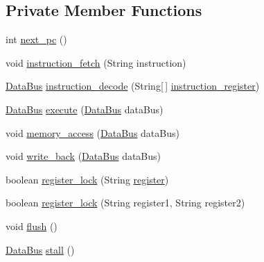 \subsection*{Private Member Functions}
\begin{DoxyCompactItemize}
\item 
int \mbox{\hyperlink{class_c_p_u_a9926463b06331bffb789febcf3cd102f}{next\+\_\+pc}} ()
\item 
void \mbox{\hyperlink{class_c_p_u_a23d225d9e85ee08b1084782d2702f62e}{instruction\+\_\+fetch}} (String instruction)
\item 
\mbox{\hyperlink{class_data_bus}{Data\+Bus}} \mbox{\hyperlink{class_c_p_u_aa2f0a271b5c6137569fe9c206388bdcc}{instruction\+\_\+decode}} (String\mbox{[}$\,$\mbox{]} \mbox{\hyperlink{class_c_p_u_ab98b435ffcf92f6c7c33992af4ebe43a}{instruction\+\_\+register}})
\item 
\mbox{\hyperlink{class_data_bus}{Data\+Bus}} \mbox{\hyperlink{class_c_p_u_a53da2e36c38199794f20432b9eb558e1}{execute}} (\mbox{\hyperlink{class_data_bus}{Data\+Bus}} data\+Bus)
\item 
void \mbox{\hyperlink{class_c_p_u_ab50af6d8dde2323a1ceea8c58e3ce5a8}{memory\+\_\+access}} (\mbox{\hyperlink{class_data_bus}{Data\+Bus}} data\+Bus)
\item 
void \mbox{\hyperlink{class_c_p_u_a130b9ffccc2c76d5bcc1b30ef5c4a4db}{write\+\_\+back}} (\mbox{\hyperlink{class_data_bus}{Data\+Bus}} data\+Bus)
\item 
boolean \mbox{\hyperlink{class_c_p_u_ae2b2850e5cec1defd6072a965d9435b3}{register\+\_\+lock}} (String \mbox{\hyperlink{class_c_p_u_ad0e0d3c3fba51527836b44298c726438}{register}})
\item 
boolean \mbox{\hyperlink{class_c_p_u_a80a32deceb58fe8d9d146c5486ce7f0b}{register\+\_\+lock}} (String register1, String register2)
\item 
void \mbox{\hyperlink{class_c_p_u_a5c034d51b86bf20154840beb0b67b85f}{flush}} ()
\item 
\mbox{\hyperlink{class_data_bus}{Data\+Bus}} \mbox{\hyperlink{class_c_p_u_a16848436db7d768084900aaeaa9c0cce}{stall}} ()
\end{DoxyCompactItemize}
